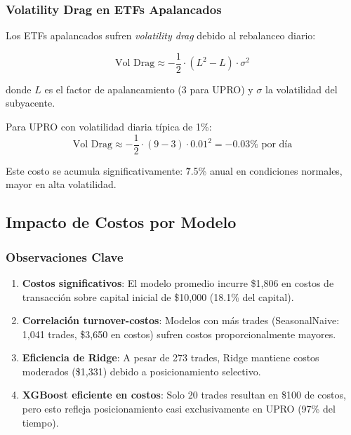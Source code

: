 \subsubsection{Volatility Drag en ETFs Apalancados}

Los ETFs apalancados sufren \textit{volatility drag} debido al rebalanceo diario:

\begin{equation}
\text{Vol Drag} \approx -\frac{1}{2} \cdot (L^2 - L) \cdot \sigma^2
\end{equation}

donde $L$ es el factor de apalancamiento (3 para UPRO) y $\sigma$ la volatilidad del subyacente.

Para UPRO con volatilidad diaria t\'ipica de 1\%:
\begin{equation}
\text{Vol Drag} \approx -\frac{1}{2} \cdot (9 - 3) \cdot 0.01^2 = -0.03\% \text{ por d\'ia}
\end{equation}

Este costo se acumula significativamente: \~7.5\% anual en condiciones normales, mayor en alta volatilidad.

\subsection{Impacto de Costos por Modelo}
\label{subsec:cost_impact}



\subsubsection{Observaciones Clave}

\begin{enumerate}
    \item \textbf{Costos significativos}: El modelo promedio incurre \$1,806 en costos de transacci\'on sobre capital inicial de \$10,000 (18.1\% del capital).

    \item \textbf{Correlaci\'on turnover-costos}: Modelos con m\'as trades (SeasonalNaive: 1,041 trades, \$3,650 en costos) sufren costos proporcionalmente mayores.

    \item \textbf{Eficiencia de Ridge}: A pesar de 273 trades, Ridge mantiene costos moderados (\$1,331) debido a posicionamiento selectivo.

    \item \textbf{XGBoost eficiente en costos}: Solo 20 trades resultan en \$100 de costos, pero esto refleja posicionamiento casi exclusivamente en UPRO (97\% del tiempo).
\end{enumerate}

